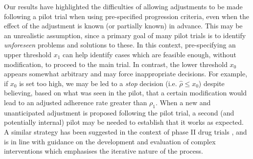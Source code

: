 \documentclass[referee, lineno, pdflatex,sn-vancouver,Numbered]{sn-jnl}%
\theoremstyle{thmstyleone}%
\theoremstyle{thmstyletwo}%
\theoremstyle{thmstylethree}%
\begin{document}
Our results have highlighted the difficulties of allowing adjustments to be made following a pilot trial when using pre-specified progression criteria, even when the effect of the adjustment is known (or partially known) in advance. This may be an unrealistic assumption, since a primary goal of many pilot trials is to identify \emph{unforeseen} problems and solutions to these. In this context, pre-specifying an upper threshold $x_1$ can help identify cases which are feasible enough, without modification, to proceed to the main trial. In contrast, the lower threshold $x_0$ appears somewhat arbitrary and may force inappropriate decisions. For example, if $x_0$ is set too high, we may be led to a \emph{stop} decision (i.e. $\hat{\rho} \leq x_0$) despite believing, based on what was seen in the pilot, that a certain modification would lead to an adjusted adherence rate greater than $\rho_1$. When a new and unanticipated adjustment is proposed following the pilot trial, a second (and potentially internal) pilot may be needed to establish that it works as expected. A similar strategy has been suggested in the context of phase II drug trials \cite{Brown2012}, and is in line with guidance on the development and evaluation of complex interventions \cite{Skivington2021} which emphasises the iterative nature of the process.


\end{document}
